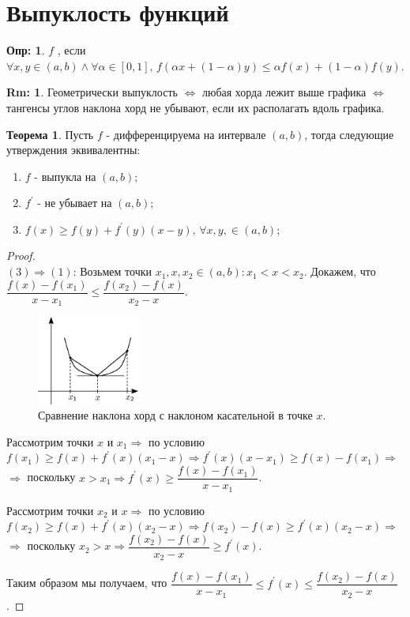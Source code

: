 \documentclass[12pt]{article}
\theoremstyle{definition}
\newtheorem{defn}{Опр:}
\newtheorem{rem}{Rm:}
\newtheorem{theorem}{Теорема}
\begin{document}
\section*{Выпуклость функций}
	
\begin{defn}
	$f$ , если $\forall x, y \in (a,b) \wedge \forall \alpha \in [0,1], \, f(\alpha x + (1-\alpha) y) \leq \alpha f(x) + (1-\alpha)f(y)$.
\end{defn}
\begin{rem}
	Геометрически выпуклость $\Leftrightarrow$ любая хорда лежит выше графика $\Leftrightarrow$ тангенсы углов наклона хорд не убывают, если их располагать вдоль графика.
\end{rem}

\begin{theorem}
	Пусть $f$ - дифференцируема на интервале $(a,b)$, тогда следующие утверждения эквивалентны:
	\begin{enumerate}[label={(\arabic*)}]
		\item $f$ - выпукла на $(a,b)$;
		\item $f^\prime$ - не убывает на $(a,b)$;
		\item $f(x) \geq f(y) + f^\prime(y)(x-y), \, \forall x,y, \in (a,b)$;
	\end{enumerate}
\end{theorem}
\begin{proof}\hfill\\
	$(3) \Rightarrow (1)$: Возьмем точки $x_1,x,x_2 \in (a,b) \colon x_1 < x < x_2$. Докажем, что $\dfrac{f(x) - f(x_1)}{x - x_1} \leq \dfrac{f(x_2) - f(x)}{x_2 - x}$.
	\begin{figure}[H]
		\centering
		\includegraphics[width=0.3\textwidth]{28_1.eps}
		\caption{Сравнение наклона хорд с наклоном касательной в точке $x$.}
		\label{28_1}
	\end{figure}
	Рассмотрим точки $x$ и $x_1 \Rightarrow$ по условию $f(x_1) \geq f(x) + f^\prime(x)(x_1 - x) \Rightarrow f^\prime(x)(x - x_1) \geq f(x) - f(x_1) \Rightarrow$\\
	$\Rightarrow$ поскольку $x > x_1 \Rightarrow f^\prime(x) \geq \dfrac{f(x) - f(x_1)}{x - x_1}$.
	
	Рассмотрим точки $x_2$ и $x \Rightarrow$ по условию $f(x_2) \geq f(x) + f^\prime(x)(x_2 - x) \Rightarrow f(x_2) - f(x) \geq f^\prime(x)(x_2 - x) \Rightarrow$\\
	$\Rightarrow$ поскольку $x_2 > x \Rightarrow \dfrac{f(x_2) - f(x)}{x_2 - x} \geq f^\prime(x)$.	
	
	Таким образом мы получаем, что $\dfrac{f(x) - f(x_1)}{x - x_1} \leq f^\prime(x) \leq \dfrac{f(x_2) - f(x)}{x_2 - x}$.
\end{proof}
\end{document}
